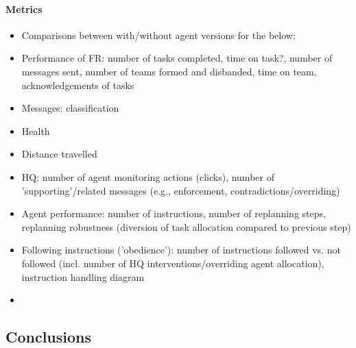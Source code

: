 \documentclass{aamas2014}
\begin{document}
\paragraph{Metrics}
\begin{itemize}
\item{Comparisons between with/without agent versions for the below:}
\item{Performance of FR: number of tasks completed, time on task?, number of messages sent, number of teams formed and disbanded, time on team, acknowledgements of tasks}
\item{Messages: classification}
\item{Health}
\item{Distance travelled}
\item{HQ: number of agent monitoring actions (clicks), number of 'supporting'/related messages (e.g., enforcement, contradictions/overriding)}
\item{Agent performance: number of instructions, number of replanning steps, replanning robustness (diversion of task allocation compared to previous step)}
\item{Following instructions ('obedience'): number of instructions followed vs. not followed (incl. number of HQ interventions/overriding agent allocation), instruction handling diagram}
\item
\end{itemize}
\subsection{Conclusions}

\end{document}
